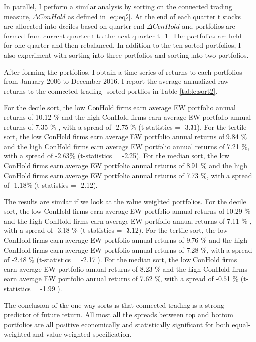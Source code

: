 \documentclass[11pt]{article}
\begin{document}
\begin{doublespace}
In parallel, I perform a similar analysis by sorting on the connected trading measure, $\Delta ConHold$ as defined in \ref{eq:eq2}.
 At the end of each quarter t stocks are allocated into deciles based on quarter-end $\Delta ConHold$ and 
portfolios are formed from current quarter t to the next quarter t+1. 
The portfolios are held for one quarter and then rebalanced. In addition to the ten sorted portfolios, I also experiment with sorting into three portfolios and sorting into two portfolios. 

After forming the portfolios, I obtain a time series of returns to each portfolios from January 2006 to December 2016. I report the average annualized raw returns to the connected trading -sorted portlios in Table \ref{table:sort2}. 

For the decile sort, the low ConHold firms earn average EW portfolio annual returns of 10.12 \% and the high ConHold firms earn average EW portfolio annual returns of 7.35 \% , with a spread of -2.75 \% (t-statistics = -3.31). For the tertile sort, the low ConHold firms earn average EW portfolio annual returns of 9.84 \% and the high ConHold firms earn average EW portfolio annual returns of 7.21 \%, with a spread of -2.63\% (t-statistics = -2.25). For the median sort, the low ConHold firms earn average EW portfolio annual returns of 8.91 \% and the high ConHold firms earn average EW portfolio annual returns of 7.73 \%, with a spread of -1.18\% (t-statistics = -2.12). 

The results are similar if we look at the value weighted portfolios. For the decile sort, the low ConHold firms earn average EW portfolio annual returns of 10.29 \% and the high ConHold firms earn average EW portfolio annual returns of 7.11 \% , with a spread of -3.18 \% (t-statistics = -3.12). For the tertile sort, the low ConHold firms earn average EW portfolio annual returns of 9.76 \% and the high ConHold firms earn average EW portfolio annual returns of 7.28 \%, with a spread of -2.48 \% (t-statistics = -2.17 ). For the median sort, the low ConHold firms earn average EW portfolio annual returns of 8.23 \% and the high ConHold firms earn average EW portfolio annual returns of 7.62 \%, with a spread of -0.61 \% (t-statistics = -1.99 ). 

The conclusion of the one-way sorts is that connected trading is a strong predictor of future return. All most all the spreads between top and bottom portfolios are all positive economically and statistically significant for both equal-weighted and value-weighted specification.


\end{doublespace}
\end{document}
